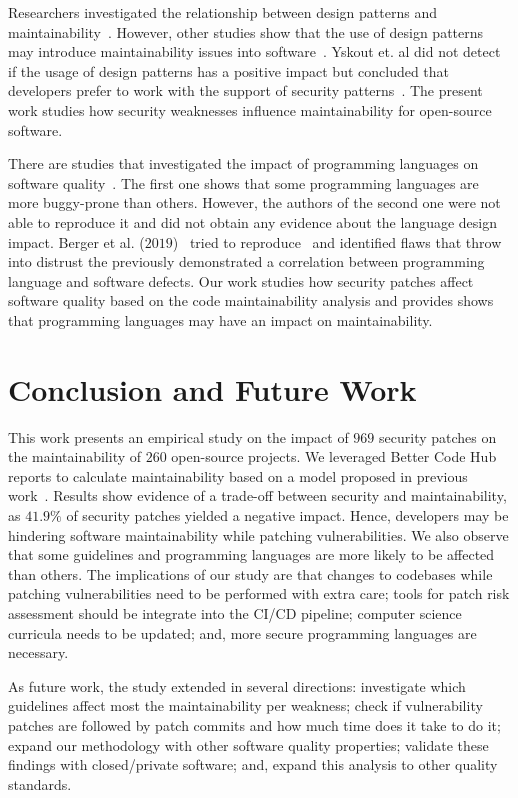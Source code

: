 \documentclass[smallextended]{svjour3}       %
\begin{document}
Researchers investigated the relationship between design patterns and
maintainability~\cite{10.1007/978-3-642-35267-6-18}. However, other studies show that 
the use of design patterns may introduce maintainability issues into
software~\cite{4493325}. Yskout et. al did not detect if the usage of 
design patterns has a positive impact but concluded that developers prefer to 
work with the support of security patterns~\cite{8077802}. The present work 
studies how security weaknesses influence maintainability for open-source software.

There are studies that investigated the impact of programming languages on software
quality~\cite{Ray:2014:LSS:2635868.2635922,Ray:2017:LSP:3144574.3126905}. The first
one shows that some programming languages are more buggy-prone than others. However,
the authors of the second one were not able to reproduce it and did not obtain any
evidence about the language design impact. 
Berger et al. ($2019$)~\cite{2019arXiv190110220B} tried to reproduce~\cite{Ray:2014:LSS:2635868.2635922,Ray:2017:LSP:3144574.3126905} 
and identified flaws that throw into distrust the 
previously demonstrated a correlation between programming language and software 
defects. Our work studies how security patches affect software quality based 
on the code maintainability analysis and provides shows that programming languages 
may have an impact on maintainability.

\section{Conclusion and Future Work}\label{sec:conclusions}

This work presents an empirical study on the impact of $969$ security
patches on the maintainability of $260$ open-source projects. We leveraged
Better Code Hub reports to calculate maintainability based on a model proposed in 
previous work~\cite{Olivari:2018,8919169}. Results show evidence of a 
trade-off between security and maintainability, as $41.9\%$ of security patches 
yielded a negative impact. Hence,
developers may be hindering software maintainability while patching 
vulnerabilities. We also observe that some guidelines 
and programming languages are more likely to be affected than others. The implications 
of our study are that changes to codebases while patching 
vulnerabilities need to be performed with extra care; tools
for patch risk assessment should be integrate into the CI/CD pipeline; computer science
curricula needs to be updated; and, more secure programming languages are necessary.

As future work, the study extended in several directions: 
investigate which guidelines affect most the maintainability per
weakness; check if vulnerability patches are followed by patch
commits and how much time does it take to do it; 
expand our methodology with other software quality properties; 
validate these findings with closed/private
software; and, expand this analysis to other quality standards.
 

\end{document}

